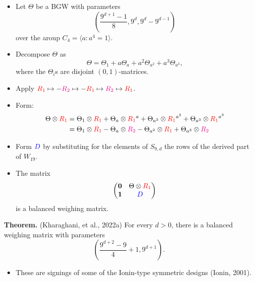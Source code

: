 \documentclass{beamer}
\newcommand{\RR}[1]{\textcolor{red}{#1}}
\newcommand{\BB}[1]{\textcolor{blue}{#1}}
\newcommand{\MM}[1]{\textcolor{magenta}{#1}}
\begin{document}
\begin{frame}

  \begin{itemize}
  \item Let $\Theta$ be a BGW with parameters
    \[
      \left(
        \frac{9^{d+1}-1}{8}, 9^d, 9^d-9^{d-1}
      \right)
    \]
    over the aroup $C_4 = \langle a : a^4=1 \rangle$.
  \item Decompose $\Theta$ as
    \[
      \Theta = \Theta_1 + a\Theta_a + a^2\Theta_{a^2} + a^3\Theta_{a^3},
    \]
    where the $\Theta_i$s are disjoint $(0,1)$-matrices.
  \end{itemize}
  
\end{frame}

\begin{frame}

  \begin{itemize}
  \item Apply $\RR{R_1} \mapsto -\MM{R_2} \mapsto -\RR{R_1} \mapsto
    \MM{R_2} \mapsto \RR{R_1}$.
  \item Form:
    \begin{align*}
      \Theta \otimes \RR{R_1} &= \Theta_1 \otimes \RR{R_1} + \Theta_a \otimes \RR{R_1}^a +
                                \Theta_{a^2} \otimes \RR{R_1}^{a^2} + \Theta_{a^3} \otimes \RR{R_1}^{a^3} \\
                              &= \Theta_1 \otimes \RR{R_1} - \Theta_a \otimes
                                \MM{R_2} - \Theta_{a^2} \otimes \RR{R_1} + \Theta_{a^3} \otimes \MM{R_2}
    \end{align*}
  \item Form $\BB{D}$ by substituting for the elements of $S_{9,d}$ the rows
    of the derived part of $W_{19}$.
  \end{itemize}
  
\end{frame}

\begin{frame}

  \begin{itemize}
  \item The matrix
    \[
      \begin{pmatrix}
        \textbf{0} & \Theta \otimes \RR{R_1} \\
        \textbf{1} & \BB{D}
      \end{pmatrix}
    \]
    is a balanced weighing matrix.
  \end{itemize}

  \begin{block}{{\bf Theorem.} (Kharaghani, et al., 2022a)}
    For every $d>0$, there is a balanced weighing matrix with parameters
    \[
      \left(
        \frac{9^{d+2}-9}{4} + 1, 9^{d+1}
      \right).
    \]
  \end{block}

  \begin{itemize}
  \item These are signings of some of the Ionin-type symmetric designs (Ionin,
    2001).
  \end{itemize}

\end{frame}
\end{document}

